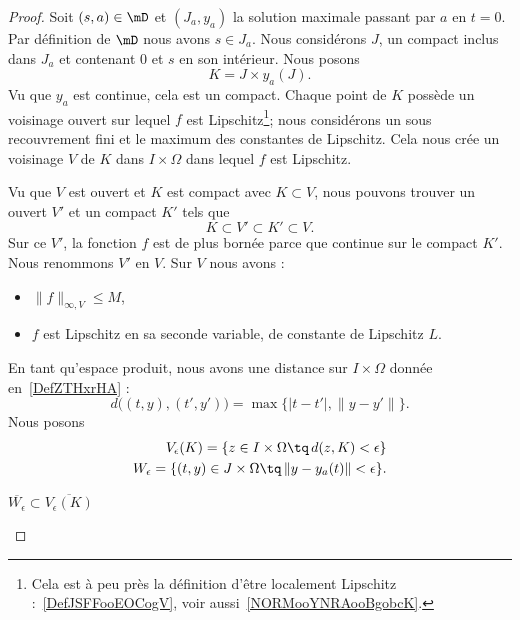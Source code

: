 \begin{proof}
	Soit \( (s,a)\in\mD\) et \( (J_a,y_a)\) la solution maximale passant par \( a\) en \( t=0\). Par définition de \( \mD\) nous avons \( s\in J_a\). Nous considérons \( J\), un compact inclus dans \( J_a\) et contenant \( 0\) et \( s\) en son intérieur. Nous posons
	\begin{equation}
		K=J\times y_a(J).
	\end{equation}
	Vu que \( y_a\) est continue, cela est un compact. Chaque point de \( K\) possède un voisinage ouvert sur lequel \( f\) est Lipschitz\footnote{Cela est à peu près la définition d'être localement Lipschitz :~\ref{DefJSFFooEOCogV}, voir aussi~\ref{NORMooYNRAooBgobcK}.}; nous considérons un sous recouvrement fini et le maximum des constantes de Lipschitz. Cela nous crée un voisinage \( V\) de \( K\) dans \( I\times \Omega\) dans lequel \( f\) est Lipschitz.

	Vu que \( V\) est ouvert et \( K\) est compact avec \( K\subset V\), nous pouvons trouver un ouvert \( V'\) et un compact \( K'\) tels que
	\begin{equation}
		K\subset V'\subset K'\subset V.
	\end{equation}
	Sur ce \( V'\), la fonction \( f\) est de plus bornée parce que continue sur le compact \( K'\). Nous renommons \( V'\) en \( V\). Sur \( V\) nous avons :
	\begin{itemize}
		\item \( \| f \|_{\infty,V}\leq M\),
		\item \( f\) est Lipschitz en sa seconde variable, de constante de Lipschitz \( L\).
	\end{itemize}


	En tant qu'espace produit, nous avons une distance sur \( I\times \Omega\) donnée en~\ref{DefZTHxrHA} :
	\begin{equation}
		d\big( (t,y),(t',y') \big)=\max\big\{  | t-t' |,\| y-y' \|   \big\}.
	\end{equation}
	Nous posons
	\begin{subequations}
		\begin{align}
			V_{\epsilon}(K)=\{ z\in I\times \Omega \tq\,d(z,K)<\epsilon  \} \\
			W_{\epsilon}=\{ (t,y)\in J\times \Omega\tq\,\| y- y_a(t) \|<\epsilon \}.
		\end{align}
	\end{subequations}

	\begin{subproof}
		\item[\( \overline{ W_{\epsilon} }\subset \overline{  V_{\epsilon}(K) }\)]


\end{subproof}
\end{proof}
